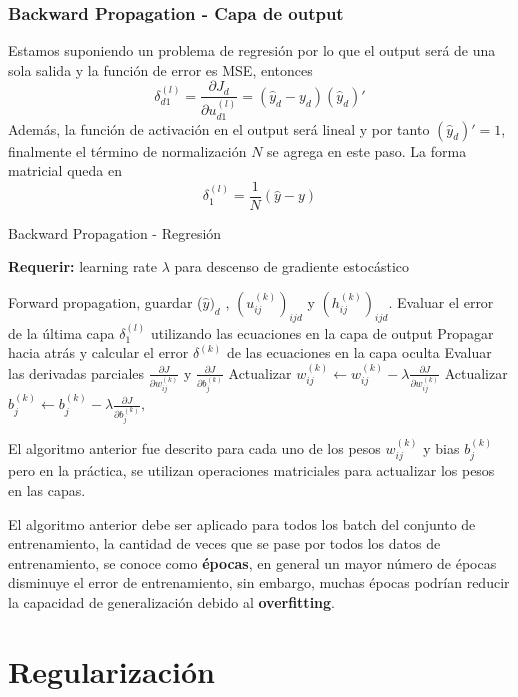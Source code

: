 \subsubsection{Backward Propagation - Capa de output}

Estamos suponiendo un problema de regresión por lo que el output será de una sola salida y la función de error es MSE, entonces 
\[
\delta_{d1}^{(l)} = \frac{\partial J_d}{\partial u_{d1}^{(l)}} = (\hat{y}_d-y_d) (\hat{y}_d)' 
\] 
Además, la función de activación en el output será lineal y por tanto $(\hat{y}_d)' = 1$, finalmente el término de normalización $N$ se agrega en este paso.  La forma matricial queda en 
\begin{equation}
\label{eq:capa_output}
\delta_{1}^{(l)} = \frac{1}{N}(\hat{y}-y)
\end{equation}

\begin{algorithm}[H]
	\caption{Backward Propagation - Regresión} \label{ML:Algorithm2}
	\textbf{Requerir: } learning rate $\lambda$ para descenso de gradiente estocástico
	\begin{algorithmic}[1]
	\State Forward propagation, guardar  ($\hat{y})_d$ , $(u_{ij}^{(k)})_{ijd}$ y $(h_{ij}^{(k)})_{ijd}$.
	\State Evaluar el error de la última capa $\delta_1^{(l)}$  utilizando las ecuaciones en la capa de output 
			\State Propagar hacia atrás y calcular el error $\delta^{(k)}$ de las ecuaciones en la capa oculta 
			\State Evaluar las derivadas parciales $\frac{\partial J}{\partial w_{ij}^{(k)}}$ y $\frac{\partial J}{\partial b_j^{(k)}}$
			\State Actualizar $w_{ij}^{(k)} \gets w_{ij}^{(k)} - \lambda \frac{\partial J}{\partial w_{ij}^{(k)}}$
			\State Actualizar $b_{j}^{(k)} \gets b_{j}^{(k)} - \lambda \frac{\partial J}{\partial b_{j}^{(k)}}, \quad$
		\EndFor
	\EndFor

	\end{algorithmic}
	
\end{algorithm}

\begin{remark}
	El algoritmo anterior fue descrito para cada uno de los pesos $w_{ij}^{(k)}$ y bias $b_{j}^{(k)}$ pero en la práctica, se utilizan operaciones matriciales para actualizar los pesos en las capas.
\end{remark}

\begin{remark}
	El algoritmo anterior debe ser aplicado para todos los batch del conjunto de entrenamiento, la cantidad de veces que se pase por todos los datos de entrenamiento, se conoce como \textbf{épocas}, en general un mayor número de épocas disminuye el error de entrenamiento, sin embargo, muchas épocas podrían reducir la capacidad de generalización debido al \textbf{overfitting}.	
\end{remark}

\section{Regularización}










